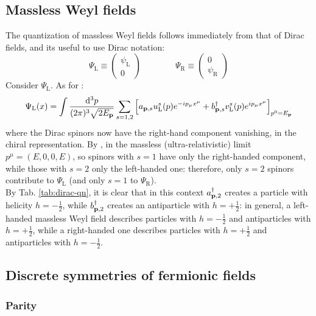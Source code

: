 \subsection{Massless Weyl fields}

The quantization of massless Weyl fields follows immediately from that of Dirac fields, and its useful to use Dirac notation:
\begin{equation*}
  \Psi_\text{L} \equiv
  \begin{pmatrix}
    \psi_\text{L} \\ 0
  \end{pmatrix}
  \qquad \qquad
  \Psi_\text{R} \equiv
  \begin{pmatrix}
    0 \\ \psi_\text{R}
  \end{pmatrix}
\end{equation*}
Consider $ \Psi_\text{L} $. As for :
\begin{equation*}
  \Psi_\text{L}(x) = \int \frac{\mathrm{d}^3p}{(2\pi)^3 \sqrt{2E_{\mathbf{p}}}} \sum_{s = 1,2} \left[ a_{\mathbf{p},s} u_\text{L}^s(p) e^{-i p_\mu x^\mu} + b_{\mathbf{p},s}^\dagger v_\text{L}^s(p) e^{i p_\mu x^\mu} \right]_{p^0 = E_{\mathbf{p}}}
\end{equation*}
where the Dirac spinors now have the right-hand component vanishing, in the chiral representation. By , in the massless (ultra-relativistic) limit $ p^\mu = (E,0,0,E) $, so spinors with $ s = 1 $ have only the right-handed component, while those with $ s = 2 $ only the left-handed one: therefore, only $ s = 2 $ spinors contribute to $ \Psi_\text{L} $ (and only $ s = 1 $ to $ \Psi_\text{R} $).\\
By Tab. \ref{tab:dirac-qn}, it is clear that in this context $ a_{\mathbf{p},2}^\dagger $ creates a particle with helicity $ h = - \frac{1}{2} $, while $ b_{\mathbf{p},2}^\dagger $ creates an antiparticle with $ h = + \frac{1}{2} $: in general, a left-handed massless Weyl field describes particles with $ h = - \frac{1}{2} $ and antiparticles with $ h = + \frac{1}{2} $, while a right-handed one describes particles with $ h = + \frac{1}{2} $ and antiparticles with $ h = - \frac{1}{2} $.

\subsection{Discrete symmetries of fermionic fields}

\subsubsection{Parity}

